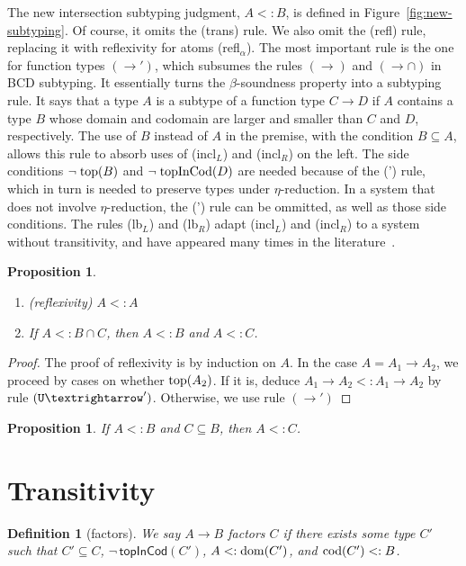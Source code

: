 \documentclass{article}
\newtheorem{proposition}[theorem]{Proposition}
\newtheorem{definition}[theorem]{Definition}
\begin{document}
The new intersection subtyping judgment, $A <: B$, is defined in
Figure~\ref{fig:new-subtyping}. Of course, it omits the (trans) rule.
We also omit the (refl) rule, replacing it with reflexivity for atoms
(refl$_\alpha$). The most important rule is the one for function types
$(→')$, which subsumes the rules $(→)$ and $({→}{∩})$ in BCD
subtyping. It essentially turns the $\beta$-soundness property into a
subtyping rule. It says that a type $A$ is a subtype of a function
type $C → D$ if $A$ contains a type $B$ whose domain and codomain are
larger and smaller than $C$ and $D$, respectively. The use of $B$
instead of $A$ in the premise, with the condition $B ⊆ A$, allows this
rule to absorb uses of (incl$_L$) and (incl$_R$) on the left.  The
side conditions $\neg\;\mathrm{top}(B)$ and $\neg\;\mathrm{topInCod}(D)$ are needed
because of the (') rule, which in turn is needed to preserve
types under $\eta$-reduction.  In a system that does not involve
$\eta$-reduction, the (') rule can be ommitted, as well as
those side conditions. The rules (lb$_L$) and (lb$_R$) adapt
(incl$_L$) and (incl$_R$) to a system without transitivity, and have
appeared many times in the literature~\citep{Bakel:1995aa}.


\begin{proposition}\ 
  \begin{enumerate}
  \item (reflexivity) $A <: A$ \label{prop:refl}
  \item If $A <: B ∩ C$, then $A <: B$ and $A <: C$. \label{prop:⊔⊑-inv}
  \end{enumerate}
\end{proposition}
\begin{proof}
  The proof of reflexivity is by induction on $A$. In the case
  $A = A_1 → A_2$, we proceed by cases on whether $\mathrm{top}(A_2)$.
  If it is, deduce $A_1 → A_2 <: A_1 → A_2$ by rule $(\TOP{→}')$.
  Otherwise, we use rule $(→')$
\end{proof}

\begin{proposition}\label{prop:u⊆v⊑w→u⊑w}
 If $A <: B$ and $C ⊆ B$, then $A <: C$.
\end{proposition}

\clearpage
\pagebreak
\section{Transitivity}


\begin{definition}[factors]
  We say $A → B$ \emph{factors} $C$
  if there exists some type $C'$ such that
  $C' ⊆ C$, $\neg\,\mathsf{topInCod}(C')$, $A <: \mathrm{dom}(C')$, and $\mathrm{cod}(C') <: B$.
\end{definition}
\end{document}
